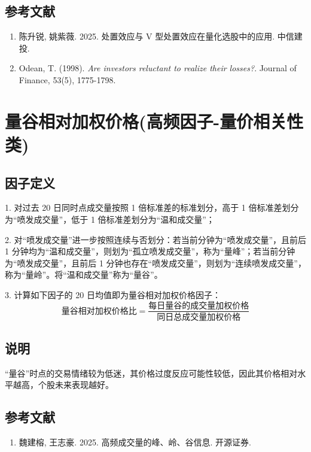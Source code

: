 \documentclass{article}
\begin{document}
\subsection{参考文献}
\begin{enumerate}
    \item 陈升锐, 姚紫薇. 2025. 处置效应与 V 型处置效应在量化选股中的应用. 中信建投.
    \item Odean, T. (1998). \textit{Are investors reluctant to realize their losses?}. Journal of Finance, 53(5), 1775-1798.
\end{enumerate}

\section{量谷相对加权价格(高频因子-量价相关性类)}

\subsection{因子定义}

1. 对过去 20 日同时点成交量按照 1 倍标准差的标准划分，高于 1 倍标准差划分为“喷发成交量”，低于 1 倍标准差划分为“温和成交量”；

2. 对“喷发成交量”进一步按照连续与否划分：若当前分钟为“喷发成交量”，且前后 1 分钟均为“温和成交量”，则划为“孤立喷发成交量”，称为“量峰”；若当前分钟为“喷发成交量”，且前后 1 分钟也存在“喷发成交量”，则划为“连续喷发成交量”，称为“量岭”。将“温和成交量”称为“量谷”。

3. 计算如下因子的 20 日均值即为量谷相对加权价格因子：
\begin{equation}
    \text{量谷相对加权价格比} = \frac{\text{每日量谷的成交量加权价格}}{\text{同日总成交量加权价格}}
\end{equation}

\subsection{说明}
“量谷”时点的交易情绪较为低迷，其价格过度反应可能性较低，因此其价格相对水平越高，个股未来表现越好。

\subsection{参考文献}
\begin{enumerate}
    \item 魏建榕, 王志豪. 2025. 高频成交量的峰、岭、谷信息. 开源证券.
\end{enumerate}
\end{document}
